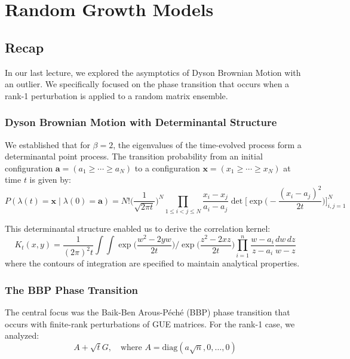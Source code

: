 \documentclass[letterpaper,11pt,oneside,reqno]{book}
\numberwithin{equation}{chapter}  %
\theoremstyle{definition}
\begin{document}
\chapter{Random Growth Models}
\label{chap:lecture12}





\section{Recap}

In our last lecture, we explored the asymptotics of Dyson Brownian Motion with an outlier. We specifically focused on the phase transition that occurs when a rank-1 perturbation is applied to a random matrix ensemble.

\subsection{Dyson Brownian Motion with Determinantal Structure}

We established that for $\beta=2$, the eigenvalues of the time-evolved process form a determinantal point process. The transition probability from an initial configuration $\mathbf{a} = (a_1 \geq \cdots \geq a_N)$ to a configuration $\mathbf{x} = (x_1 \geq \cdots \geq x_N)$ at time $t$ is given by:
\begin{equation*}
P(\lambda(t) = \mathbf{x} \mid \lambda(0) = \mathbf{a}) = N! \Big(\frac{1}{\sqrt{2\pi t}}\Big)^N \prod_{1\leq i<j\leq N}\frac{x_i - x_j}{a_i - a_j} \det\Big[\exp\Big(-\frac{(x_i - a_j)^2}{2t}\Big)\Big]_{i,j=1}^N
\end{equation*}

This determinantal structure enabled us to derive the correlation kernel:
\begin{equation}\label{lecture12:eq:correlation-kernel}
K_t(x,y) = \frac{1}{(2\pi)^2 t} \int\int \exp\Big(\frac{w^2 - 2yw}{2t}\Big) \bigg/ \exp\Big(\frac{z^2 - 2xz}{2t}\Big) \prod_{i=1}^n \frac{w-a_i}{z-a_i} \frac{dw\,dz}{w-z}
\end{equation}
where the contours of integration are specified to maintain analytical properties.

\subsection{The BBP Phase Transition}

The central focus was the Baik-Ben Arous-Péché (BBP) phase transition that occurs with finite-rank perturbations of GUE matrices. For the rank-1 case, we analyzed:
\begin{equation*}
A + \sqrt{t}G, \quad \text{where } A = \text{diag}(a\sqrt{n},0,\ldots,0)
\end{equation*}
\end{document}
